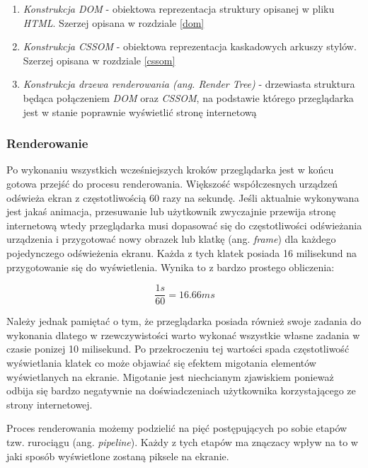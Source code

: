\documentclass[polish, twoside, 12pt]{mwart}
\begin{document}
\begin{enumerate}
  \item \emph{Konstrukcja DOM} - obiektowa reprezentacja struktury opisanej w pliku \emph{HTML}. Szerzej opisana w rozdziale \ref{dom}
  \item \emph{Konstrukcja CSSOM} - obiektowa reprezentacja kaskadowych arkuszy stylów. Szerzej opisana w rozdziale \ref{cssom}
  \item \emph{Konstrukcja drzewa renderowania (ang. Render Tree)} - drzewiasta struktura będąca połączeniem \emph{DOM} oraz \emph{CSSOM}, na podstawie którego przeglądarka jest w stanie poprawnie wyświetlić stronę internetową
\end{enumerate}

\subsubsection{Renderowanie}

Po wykonaniu wszystkich wcześniejszych kroków przeglądarka jest w końcu gotowa przejść do procesu renderowania. Większość współczesnych urządzeń odświeża ekran z częstotliwością 60 razy na sekundę. Jeśli aktualnie wykonywana jest jakaś animacja, przesuwanie lub użytkownik zwyczajnie przewija stronę internetową wtedy przeglądarka musi dopasować się do częstotliwości odświeżania urządzenia i przygotować nowy obrazek lub klatkę (ang. \emph{frame}) dla każdego pojedynczego odświeżenia ekranu. Każda z tych klatek posiada 16 milisekund na przygotowanie się do wyświetlenia. Wynika to z bardzo prostego obliczenia:

\begin{equation}
  \frac{1s}{60} = 16.66 ms
\end{equation}

Należy jednak pamiętać o tym, że przeglądarka posiada również swoje zadania do wykonania dlatego w rzewczywistości warto wykonać wszystkie własne zadania w czasie ponizej 10 milisekund. Po przekroczeniu tej wartości spada częstotliwość wyświetlania klatek co może objawiać się efektem migotania elementów wyświetlanych na ekranie. Migotanie jest niechcianym zjawiskiem ponieważ odbija się bardzo negatywnie na doświadczeniach użytkownika korzystającego ze strony internetowej.

Proces renderowania możemy podzielić na pięć postępujących po sobie etapów tzw. rurociągu (ang. \emph{pipeline}). Każdy z tych etapów ma znączacy wpływ na to w jaki sposób wyświetlone zostaną piksele na ekranie.
\end{document}
